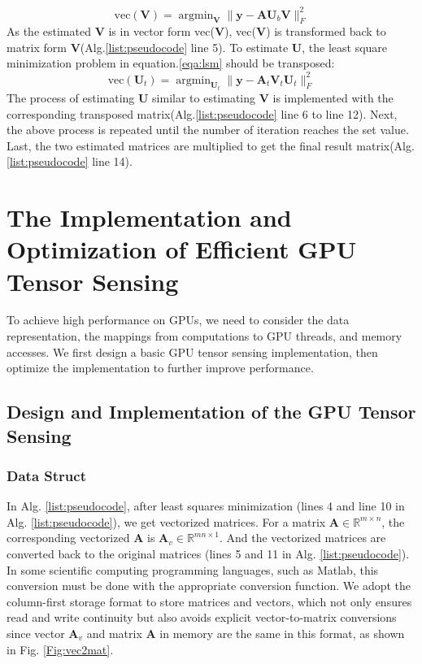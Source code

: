 \documentclass[futureinternet,article,submit,moreauthors,pdftex,10pt,a4paper]{Definitions/mdpi}
\theoremstyle{plain}
\theoremstyle{definition}
\theoremstyle{remark}
\begin{document}
        \begin{equation}
            \label{eqa:lsm}
            \text{vec}(\mathbf{V})=
        \mathop{\arg\min}_{ \mathbf{V}} \| \mathbf{y} - \mathbf{A}\mathbf{U}_b\mathbf{V} \|_F^2
        \end{equation}
        As the estimated $\mathbf{V}$ is in vector form vec($\mathbf{V}$), vec($\mathbf{V}$) is transformed back to matrix form $\mathbf{V}$(Alg.\ref{list:pseudocode} line 5).
        To estimate $\mathbf{U}$, the least square minimization problem in equation.\ref{eqa:lsm} should be transposed:
        \begin{equation}
            \label{eqa:lsm1}
            \text{vec}(\mathbf{U}_t)=
        \mathop{\arg\min}_{ \mathbf{U}_t} \| \mathbf{y} - \mathbf{A}_t\mathbf{V}_t\mathbf{U}_t \|_F^2
        \end{equation}
        The process of estimating $\mathbf{U}$ similar to estimating $\mathbf{V}$ is implemented with the corresponding transposed matrix(Alg.\ref{list:pseudocode} line 6 to line 12).
        Next, the above process is repeated until the number of iteration reaches the set value.
        Last, the two estimated matrices are multiplied to get the final result matrix(Alg.\ref{list:pseudocode} line 14).
\section{The Implementation and Optimization of Efficient GPU Tensor Sensing}
\label{SEC_GPU}
To achieve high performance on GPUs, we need to consider the data representation, the mappings from computations to GPU threads, and memory accesses. We first design a basic GPU tensor sensing implementation, then optimize the implementation to further improve performance.

\subsection{Design and Implementation of the GPU Tensor Sensing}
\subsubsection{Data Struct}
In Alg. \ref{list:pseudocode}, after least squares minimization (lines 4 and line 10 in Alg. \ref{list:pseudocode}), we get vectorized matrices. For a matrix $\mathbf{A} \in \mathbb{R}^{m \times n}$, the corresponding vectorized $\mathbf{A}$ is $\mathbf{A}_v \in \mathbb{R}^{mn \times 1}$. And the vectorized matrices are converted back to the original matrices (lines 5 and 11 in Alg. \ref{list:pseudocode}). In some scientific computing programming languages, such as Matlab, this conversion must be done with the appropriate conversion function.
We adopt the column-first storage format to store matrices and vectors, which not only ensures read and write continuity but also avoids explicit vector-to-matrix conversions since vector $\mathbf{A}_v$ and matrix $\mathbf{A}$ in memory are the same in this format, as shown in Fig. \ref{Fig:vec2mat}.
\end{document}
